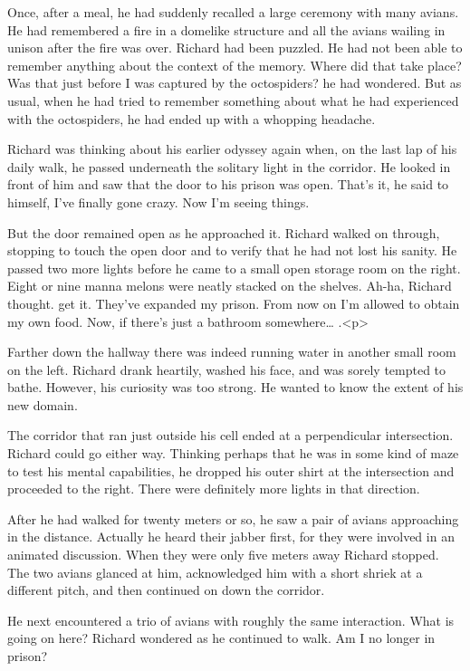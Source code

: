 \documentclass[]{article}
\begin{document}
{Once, after a meal, he had suddenly recalled a large ceremony with many avians. He had remembered a fire in a domelike structure and all the avians wailing in unison after the fire was over. Richard had been puzzled. He had not been able to remember anything about the context of the memory. Where did that take place? Was that just before I was captured by the octospiders? he had wondered. But as usual, when he had tried to remember something about what he had experienced with the octospiders, he had ended up with a whopping headache.

Richard was thinking about his earlier odyssey again when, on the last lap of his daily walk, he passed underneath the solitary light in the corridor. He looked in front of him and saw that the door to his prison was open. That’s it, he said to himself, I’ve finally gone crazy. Now I’m seeing things.

But the door remained open as he approached it. Richard walked on through, stopping to touch the open door and to verify that he had not lost his sanity. He passed two more lights before he came to a small open storage room on the right. Eight or nine manna melons were neatly stacked on the shelves. Ah-ha, Richard thought. get it. They’ve expanded my prison. From now on I’m allowed to obtain my own food. Now, if there’s just a bathroom somewhere… .<p>

Farther down the hallway there was indeed running water in another small room on the left. Richard drank heartily, washed his face, and was sorely tempted to bathe. However, his curiosity was too strong. He wanted to know the extent of his new domain.

The corridor that ran just outside his cell ended at a perpendicular intersection. Richard could go either way. Thinking perhaps that he was in some kind of maze to test his mental capabilities, he dropped his outer shirt at the intersection and proceeded to the right. There were definitely more lights in that direction.

After he had walked for twenty meters or so, he saw a pair of avians approaching in the distance. Actually he heard their jabber first, for they were involved in an animated discussion. When they were only five meters away Richard stopped. The two avians glanced at him, acknowledged him with a short shriek at a different pitch, and then continued on down the corridor.

He next encountered a trio of avians with roughly the same interaction. What is going on here? Richard wondered as he continued to walk. Am I no longer in prison?

}
\end{document}
